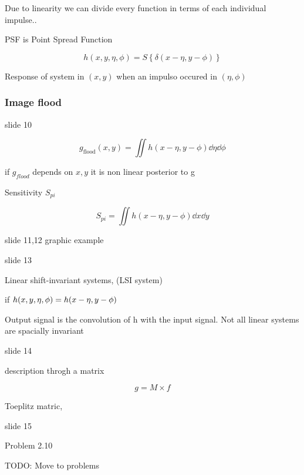 \documentclass[../main/main.tex]{subfiles}
\begin{document}
Due to linearity we can divide every function in terms of each individual impulse..

PSF is Point Spread Function


\begin{equation}
	h(x,y,\eta,\phi) =  S\left\{\delta(x-\eta,y-\phi)\right\}
\end{equation}

Response of system in $(x,y)$ when an impulso occured in $(\eta,\phi)$

\subsubsection{Image flood}

slide 10

\begin{equation}
	g_{\textrm{flood}}(x,y) = \iint h(x-\eta,y-\phi) \dd{\eta}\dd{\phi}
\end{equation}

if $g_{flood}$ depends on $x,y$ it is non linear posterior to g

Sensitivity $S_{pi}$

\begin{equation}
	S_{pi} = \iint h(x-\eta,y-\phi) \dd{x}\dd{y}
\end{equation}

slide 11,12 graphic example


slide 13

Linear shift-invariant systems, (LSI system)

if $h(x,y,\eta,\phi) = h(x-\eta, y-\phi)$

Output signal is the convolution of h with the input signal. Not all linear systems are spacially invariant

slide 14

description throgh a matrix

\begin{equation}
	g = M\times f
\end{equation}

Toeplitz matric,



slide 15

Problem 2.10

TODO: Move to problems
\end{document}
